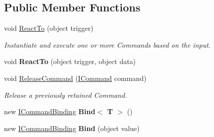 \subsection*{Public Member Functions}
\begin{DoxyCompactItemize}
\item 
void \hyperlink{interfacebabel_1_1extensions_1_1command_1_1api_1_1_i_command_binder_a50e05144d88aa86e46b8d78125667e43}{React\-To} (object trigger)
\begin{DoxyCompactList}\small\item\em Instantiate and execute one or more Commands based on the input. \end{DoxyCompactList}\item 
\hypertarget{interfacebabel_1_1extensions_1_1command_1_1api_1_1_i_command_binder_a7062e414641978e785490334d8b2414b}{void {\bfseries React\-To} (object trigger, object data)}\label{interfacebabel_1_1extensions_1_1command_1_1api_1_1_i_command_binder_a7062e414641978e785490334d8b2414b}

\item 
void \hyperlink{interfacebabel_1_1extensions_1_1command_1_1api_1_1_i_command_binder_a03df21f7c6b2c9628dc00afc34d08a2e}{Release\-Command} (\hyperlink{interfacebabel_1_1extensions_1_1command_1_1api_1_1_i_command}{I\-Command} command)
\begin{DoxyCompactList}\small\item\em Release a previously retained Command. \end{DoxyCompactList}\item 
\hypertarget{interfacebabel_1_1extensions_1_1command_1_1api_1_1_i_command_binder_a5b21a6bf1e355ce44134d4c421901190}{new \hyperlink{interfacebabel_1_1extensions_1_1command_1_1api_1_1_i_command_binding}{I\-Command\-Binding} {\bfseries Bind$<$ T $>$} ()}\label{interfacebabel_1_1extensions_1_1command_1_1api_1_1_i_command_binder_a5b21a6bf1e355ce44134d4c421901190}

\item 
\hypertarget{interfacebabel_1_1extensions_1_1command_1_1api_1_1_i_command_binder_a47f81e31c16288d88c978892bca6c15a}{new \hyperlink{interfacebabel_1_1extensions_1_1command_1_1api_1_1_i_command_binding}{I\-Command\-Binding} {\bfseries Bind} (object value)}\label{interfacebabel_1_1extensions_1_1command_1_1api_1_1_i_command_binder_a47f81e31c16288d88c978892bca6c15a}

\end{DoxyCompactItemize}


